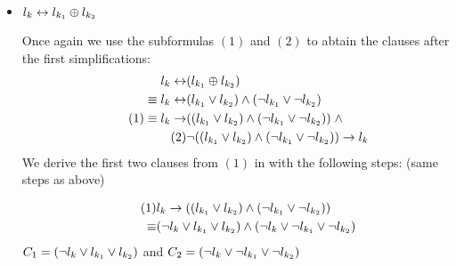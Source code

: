 \documentclass[11pt,a4paper]{uebung}
\begin{document}
\begin{enumerate}
{\begin{itemize}
     For the second formula we can calculate the following clauses:
      \begin{align*}
        \tag{2}& (\lia \ra \lib \land \lib \ra \lia) \ra \li\\
        \equiv &\neg((\neg\lia\lor\lib) \land (\neg\lib \lor \lia))
        \lor \li\\
        \tag {rule 2}\equiv &((\lia\land\neg\lib)\lor(\lib\land\neg\lia))\lor\li \\
        \tag {rule 2}\equiv &((\lia \lor(\lib \land
        \neg\lia)\land(\neg\lib\lor(\lib\lor\neg\lia)))\lor\li  \\
        \tag {rule 1}\equiv & ((\lia \lor \lib) \land (\lia \lor \neg\lia) \land
        (\neg\lib \lor \lib) \land (\neg\lib \lor \neg\lia)) \lor
        \li  \\
        \equiv & (\li \lor \lia \lor \lib) \land (\li \lor \neg\lib \lor \neg\lia)
      \end{align*}
      So we derive the next two clauses $C_{3}=(\li \lor \lia \lor \lib)$
      and $C_{4}=(\li \lor \neg\lib \lor \neg\lia)$ and the we are finished for the equivalence.
 \bigskip 
    
    \item $l_{k} \leftrightarrow l_{k_1} \oplus l_{k_2}$
      
     Once again we use the subformulas $(1)$ and $(2)$ to abtain the clauses after the first simplifications:
      \begin{align*}
        l_{k} \leftrightarrow& (l_{k_1} \oplus l_{k_2}) \\
        \equiv l_{k} \leftrightarrow& (l_{k_1} \lor l_{k_2}) \land (\neg l_{k_1} \lor \neg l_{k_2})\\
        \tag{1}\equiv l_{k} \rightarrow& ((l_{k_1} \lor l_{k_2}) \land (\neg l_{k_1} \lor \neg l_{k_2}))\; \land\\
        \tag{2}& \neg((l_{k_1} \lor l_{k_2}) \land (\neg l_{k_1} \lor \neg l_{k_2})) \rightarrow l_{k}
      \end{align*}
      We derive the first two clauses from $(1)$ in with the following steps: (same steps as above)
     
      \begin{align*}
        \tag{1}&l_{k} \rightarrow ((l_{k_1} \lor l_{k_2}) \land (\neg l_{k_1} \lor \neg l_{k_2}))\\
        \equiv &(\neg l_{k}\lor l_{k_1}\lor l_{k_2}) \land (\neg l_{k}\lor\neg l_{k_1}\lor\neg l_{k_2})    
      \end{align*}
      $C_{1}=(\neg l_{k}\lor l_{k_1}\lor l_{k_2})$ and
      $C_{2}=(\neg l_{k}\lor\neg l_{k_1}\lor\neg l_{k_2})$ 
     

\end{itemize}}
\end{enumerate}
\end{document}
